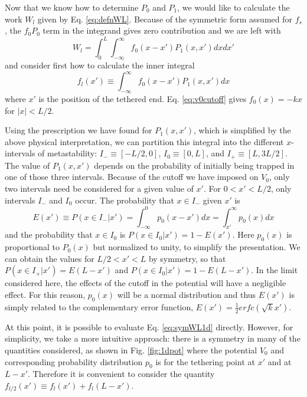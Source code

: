 \documentclass[journal = mamobx, manuscript = article]{achemso}
\begin{document}
Now that we know how to determine $P_0$ and $P_1$, we would like to calculate the
work $W_l$ given by Eq. \ref{eq:defnWL}. Because of the symmetric form assumed
for $f_s$, the $f_0 P_0$ term in the integrand gives zero contribution and we
are left with
\begin{equation}
\label{eq:symWL1d}
W_l = \int_0^L \int_{-\infty}^\infty  f_0(x-x') P_1(x,x')dx dx'
\end{equation}
and consider first how to calculate the inner integral
\begin{equation}
\label{eq:F1d}
f_l(x') \equiv \int_{-\infty}^\infty f_0(x-x') P_1(x,x')dx 
\end{equation}
where $x'$ is the position of the tethered end.  Eq. \ref{eq:v0cutoff} gives $f_0(x) = -kx$ for $|x|<L/2$.

Using the prescription we have found for $P_1(x,x')$, which is simplified by the above physical interpretation, we can partition this integral
into the different $x$-intervals of metastability: $I_- \equiv[-L/2,0]$, $I_0 \equiv [0,L]$, and $I_+ \equiv [L,3L/2]$.
The value of $P_1(x,x')$ depends on the probability of initially being trapped in
one of those three intervals. Because of the cutoff we have imposed on $V_0$,
only two intervals need be considered for a given value of $x'$. For $0 < x' < L/2$, only intervals $I_-$ and
$I_0$ occur.  The probability that $x \in I_-$ given $x'$ is
\begin{equation}
E(x') \equiv P(x \in I_-| x') = \int_{-\infty}^0 p_0(x-x') dx  = \int_{x'}^\infty p_0(x) dx
\end{equation}
and the probability that $x \in I_0$ is $P(x \in I_0|x') = 1-E(x')$.
Here $p_0(x)$ is proportional to $P_0(x)$ but normalized to unity, to simplify
the presentation.
We can obtain the values for $L/2 < x' < L$ by symmetry, so that $P(x \in I_+| x') = E(L-x')$ and
$P(x \in I_0|x') = 1-E(L-x')$.  In the limit considered here, the effects of the cutoff in the potential will have a negligible effect. For this reason, $p_0(x)$ will be a normal distribution and thus $E(x')$ is simply related to the complementary
error function, $E(x') = \frac{1}{2}erfc(\sqrt{k}x')$. 

At this point, it is possible to evaluate Eq. \ref{eq:symWL1d} directly. However, for simplicity, we take a more intuitive approach: there is a symmetry in many of the quantities considered, as shown in Fig. \ref{fig:1dpot} where the
potential $V_0$  and corresponding probability distribution $p_0$ is for the tethering point at
$x'$ and at $L-x'$. Therefore it is convenient to consider the quantity $f_{l/2}(x')\equiv f_l(x') + f_l(L-x')$. 
\end{document}
